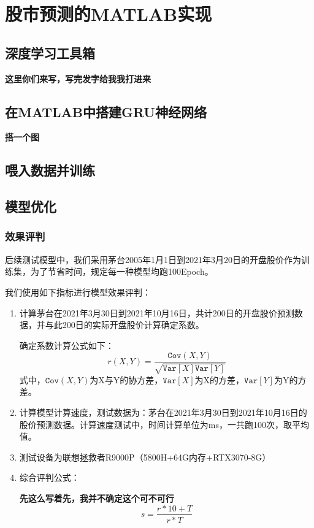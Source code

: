 \documentclass{jnuthesis}
\begin{document}
\chapter{股市预测的MATLAB实现}
\section{深度学习工具箱}

\textbf{这里你们来写，写完发字给我我打进来}
\section{在MATLAB中搭建GRU神经网络}

\textbf{搭一个图}

\section{喂入数据并训练}

\section{模型优化}


\subsection{效果评判}
后续测试模型中，我们采用茅台2005年1月1日到2021年3月20日的开盘股价作为训练集，为了节省时间，规定每一种模型均跑100Epoch。

我们使用如下指标进行模型效果评判：

\begin{enumerate}
	\item 计算茅台在2021年3月30日到2021年10月16日，共计200日的开盘股价预测数据，并与此200日的实际开盘股价计算确定系数。
	
	确定系数计算公式如下：
	\begin{equation}\label{r}
		r(X,Y)=\dfrac{\texttt{Cov}(X,Y)}{\sqrt{\texttt{Var}[X]\texttt{Var}[Y]}}
	\end{equation}
	式中，$ \texttt{Cov}(X,Y) $为X与Y的协方差，$ \texttt{Var}[X] $为X的方差，$ \texttt{Var}[Y] $为Y的方差。
	\item 计算模型计算速度，测试数据为：茅台在2021年3月30日到2021年10月16日的股价预测数据。计算速度测试中，时间计算单位为ms，一共跑100次，取平均值。
	\item 测试设备为联想拯救者R9000P（5800H+64G内存+RTX3070-8G）
	
	\item 综合评判公式：
	
	\textbf{先这么写着先，我并不确定这个可不可行}
	\begin{equation}\label{pingpan}
		s=\dfrac{r*10+T}{r*T}
	\end{equation}
\end{enumerate}
\end{document}
